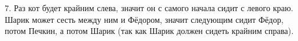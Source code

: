 7. Раз кот будет крайним слева, значит он с самого начала сидит с левого краю. Шарик может сесть между ним и Фёдором, значит следующим сидит Фёдор, потом Печкин, а потом Шарик (так как Шарик должен сидеть крайним справа).\\
